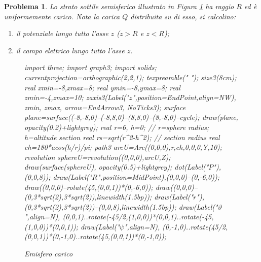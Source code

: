 \documentclass[a4paper,oneside]{article}
\newtheorem{problema}{Problema}
\let\oldhat\hat
\renewcommand{\vec}[1]{\mathbf{#1}}
\renewcommand{\hat}[1]{\widehat{\mathbf{#1}}}
\begin{document}
\begin{problema}
	Lo strato sottile semisferico illustrato in Figura \ref{fig:emisfero_carico} ha raggio
	$R$ ed è uniformemente carico. Nota la carica $Q$ distribuita su di esso, si calcolino:
	\begin{enumerate}
		\item il potenziale lungo tutto l'asse $z$ ($z>R$ e $z<R$);
		\item il campo elettrico lungo tutto l'asse $z$.
	\end{enumerate}
	\begin{figure}%
		\centering
		\begin{asy}[height=6cm,inline=true,attach=false,viewportwidth=\linewidth]
			import three;
			import graph3;
			import solids;
			currentprojection=orthographic(2,2,1);
			texpreamble("\let\oldhat\hat
			\renewcommand{\vec}[1]{\mathbf{#1}}
			\renewcommand{\hat}[1]{\oldhat{\mathbf{#1}}}");
			size3(8cm);
			real xmin=-8,xmax=8;
			real ymin=-8,ymax=8;
			real zmin=-4,zmax=10;
			zaxis3(Label("\small $z$",position=EndPoint,align=NW),
			zmin, zmax, arrow=EndArrow3, NoTicks3);
			surface plane=surface((-8,-8,0)--(-8,8,0)--(8,8,0)--(8,-8,0)--cycle);
			draw(plane, opacity(0.2)+lightgrey);
			real r=6, h=0; // r=sphere radius; h=altitude section
			real rs=sqrt(r^2-h^2); // section radius
			real ch=180*acos(h/r)/pi;
			path3 arcU=Arc((0,0,0),r,ch,0,0,0,Y,10);
			revolution sphereU=revolution((0,0,0),arcU,Z);
			draw(surface(sphereU), opacity(0.5)+lightgrey);
			dot(Label("\small $P$"),(0,0,8));
			draw(Label("\small $R$",position=MidPoint),(0,0,0)--(0,-6,0));
			draw((0,0,0)--rotate(45,(0,0,1))*(0,-6,0));
			draw((0,0,0)--(0,3*sqrt(2),3*sqrt(2)),linewidth(1.5bp));
			draw(Label("\small $r$"),(0,3*sqrt(2),3*sqrt(2))--(0,0,8),linewidth(1.5bp));
			draw(Label("\small $\vartheta$",align=N),
			(0,0,1)..rotate(-45/2,(1,0,0))*(0,0,1)..rotate(-45,(1,0,0))*(0,0,1));
			draw(Label("\small $\psi$",align=N),
			(0,-1,0)..rotate(45/2,(0,0,1))*(0,-1,0)..rotate(45,(0,0,1))*(0,-1,0));
		\end{asy}
		\caption{Emisfero carico}
		\label{fig:emisfero_carico}
	\end{figure}	
\end{problema}
\end{document}
